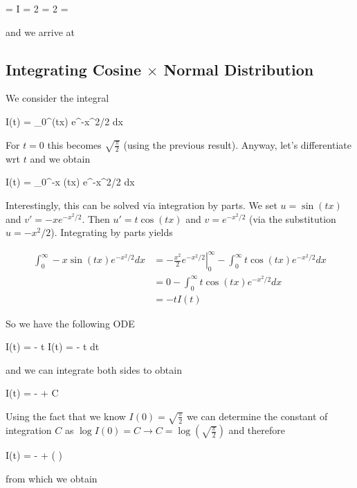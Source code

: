 \bee
{} =  \rightarrow I = 2  = 2  = \sqrt{2 \pi}
\eee

and we arrive at

\bee
{}
\eee


\subsection{Integrating Cosine $\times$ Normal Distribution}

We consider the integral

\bee
I(t) = \int_0^\infty \cos(tx) e^{-x^2/2} dx
\eee

For $t=0$ this becomes $\sqrt{\frac{\pi}{2}}$ (using the previous result). Anyway, let's differentiate wrt $t$ and we obtain

\bee
{} I(t) = \int_0^\infty -x \sin(tx) e^{-x^2/2} dx
\eee

Interestingly, this can be solved via integration by parts. We set $u = \sin(tx)$ and $v' = -x e^{-x^2/2}$. Then $u' = t \cos(tx)$ and $v = e^{-x^2/2}$ (via the substitution $u = -x^2 / 2$). Integrating by parts yields

\begin{align*}
    \int_0^\infty -x \sin(tx) e^{-x^2/2} dx &= - \left. \frac{x^2}{2} e^{-x^2/2} \right|_0^\infty - \int_0^\infty t \cos(tx) e^{-x^2/2} dx \\ &= 0 - \int_0^\infty t \cos(tx) e^{-x^2/2} dx \\ &= - t I(t)
\end{align*}

So we have the following ODE

\bee
{} I(t) = - t I(t) \rightarrow {} = - t dt
\eee

and we can integrate both sides to obtain

\bee
\log I(t) = -  + C
\eee

Using the fact that we know $I(0) = \sqrt{\frac{\pi}{2}}$ we can determine the constant of integration $C$ as $\log I(0) = C \rightarrow C = \log(\sqrt{ \frac{\pi}{2} })$ and therefore

\bee
\log I(t) = -  + \log\left(  \right)
\eee

from which we obtain

\bee
{}
\eee

